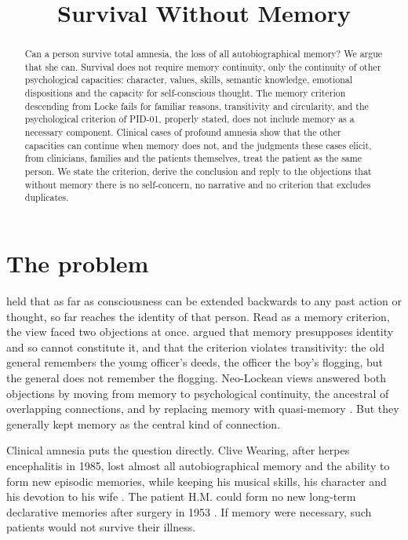 \documentclass{situationist-preprint}
\title{Survival Without Memory}
\begin{document}
\maketitle

\begin{abstract}
Can a person survive total amnesia, the loss of all autobiographical memory? We argue that she can. Survival does not require memory continuity, only the continuity of other psychological capacities: character, values, skills, semantic knowledge, emotional dispositions and the capacity for self-conscious thought. The memory criterion descending from Locke fails for familiar reasons, transitivity and circularity, and the psychological criterion of PID-01, properly stated, does not include memory as a necessary component. Clinical cases of profound amnesia show that the other capacities can continue when memory does not, and the judgments these cases elicit, from clinicians, families and the patients themselves, treat the patient as the same person. We state the criterion, derive the conclusion and reply to the objections that without memory there is no self-concern, no narrative and no criterion that excludes duplicates.
\end{abstract}

\section{The problem}

\citet[II.xxvii.9]{Locke1694} held that as far as consciousness can be extended backwards to any past action or thought, so far reaches the identity of that person. Read as a memory criterion, the view faced two objections at once. \citet{Butler1736} argued that memory presupposes identity and so cannot constitute it, and \citet[III.6]{Reid1785} that the criterion violates transitivity: the old general remembers the young officer's deeds, the officer the boy's flogging, but the general does not remember the flogging. Neo-Lockean views answered both objections by moving from memory to psychological continuity, the ancestral of overlapping connections, and by replacing memory with quasi-memory \citep{Shoemaker1970,Parfit1984}. But they generally kept memory as the central kind of connection.

Clinical amnesia puts the question directly. Clive Wearing, after herpes encephalitis in 1985, lost almost all autobiographical memory and the ability to form new episodic memories, while keeping his musical skills, his character and his devotion to his wife \citep{Wearing2005}. The patient H.M. could form no new long-term declarative memories after surgery in 1953 \citep{ScovilleMilner1957}. If memory were necessary, such patients would not survive their illness.
\end{document}
